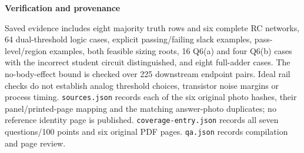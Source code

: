 \documentclass[10pt]{article}
\newcommand{\qheading}[1]{\par\medskip\textbf{#1}\par}
\begin{document}
\qheading{Verification and provenance}
Saved evidence includes eight majority truth rows and six complete RC networks, 64 dual-threshold logic cases, explicit passing/failing slack examples, pass-level/region examples, both feasible sizing roots, 16 Q6(a) and four Q6(b) cases with the incorrect student circuit distinguished, and eight full-adder cases. The no-body-effect bound is checked over 225 downstream endpoint pairs. Ideal rail checks do not establish analog threshold choices, transistor noise margins or process timing.
\texttt{sources.json} records each of the six original photo hashes, their panel/printed-page mapping and the matching answer-photo duplicates; no reference identity page is published. \texttt{coverage-entry.json} records all seven questions/100 points and six original PDF pages. \texttt{qa.json} records compilation and page review.
\end{document}
